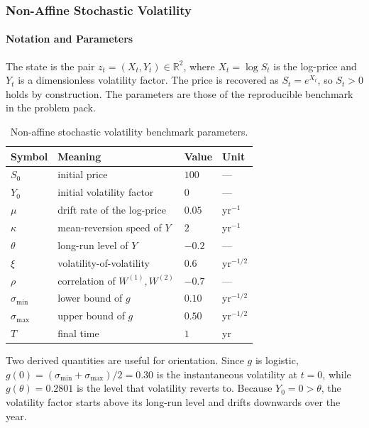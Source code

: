 \documentclass[11pt,a4paper]{article}
\theoremstyle{definition}
\theoremstyle{remark}
\begin{document}
\subsubsection{Non-Affine Stochastic Volatility}
\label{sec:nasv-model}

\paragraph{Notation and Parameters}
The state is the pair $z_t = (X_t, Y_t) \in \mathbb{R}^2$, where
$X_t = \log S_t$ is the log-price and $Y_t$ is a dimensionless volatility
factor. The price is recovered as $S_t = e^{X_t}$, so $S_t > 0$ holds by
construction. The parameters are those of the reproducible benchmark in the
problem pack.

\begin{table}[H]
\centering
\begin{tabular}{llll}
\toprule
\textbf{Symbol} & \textbf{Meaning} & \textbf{Value} & \textbf{Unit} \\
\midrule
$S_0$                         & initial price                  & $100$  & --- \\
$Y_0$                         & initial volatility factor      & $0$    & --- \\
$\mu$                         & drift rate of the log-price    & $0.05$ & yr$^{-1}$ \\
$\kappa$                      & mean-reversion speed of $Y$    & $2$    & yr$^{-1}$ \\
$\theta$                      & long-run level of $Y$          & $-0.2$ & --- \\
$\xi$                         & volatility-of-volatility       & $0.6$  & yr$^{-1/2}$ \\
$\rho$                        & correlation of $W^{(1)}, W^{(2)}$ & $-0.7$ & --- \\
$\sigma_{\min}$               & lower bound of $g$             & $0.10$ & yr$^{-1/2}$ \\
$\sigma_{\max}$               & upper bound of $g$             & $0.50$ & yr$^{-1/2}$ \\
$T$                           & final time                     & $1$    & yr \\
\bottomrule
\end{tabular}
\caption{Non-affine stochastic volatility benchmark parameters.}
\label{tab:nasv-params}
\end{table}

Two derived quantities are useful for orientation. Since $g$ is logistic,
$g(0) = (\sigma_{\min} + \sigma_{\max})/2 = 0.30$ is the instantaneous
volatility at $t = 0$, while $g(\theta) = 0.2801$ is the level that volatility
reverts to. Because $Y_0 = 0 > \theta$, the volatility factor starts above its
long-run level and drifts downwards over the year.
\end{document}

